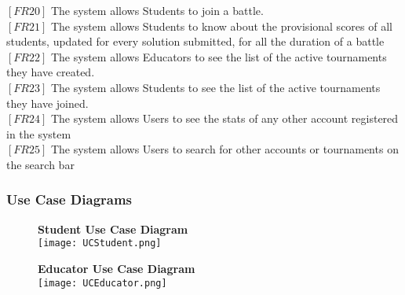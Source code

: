 \documentclass{article}
\begin{document}
$[FR20]$ The system allows Students to join a battle. \\
$[FR21]$ The system allows Students to know about the provisional scores of all students, updated for every solution submitted, for all the duration of a battle\\
$[FR22]$ The system allows Educators to see the list of the active tournaments they have created.\\
$[FR23]$ The system allows Students to see the list of the active tournaments they have joined.\\
$[FR24]$ The system allows Users to see the stats of any other account registered in the system\\
$[FR25]$ The system allows Users to search for other accounts or tournaments on the search bar\\


\subsubsection{Use Case Diagrams}

\begin{figure}[H]
  \centering
  \textbf{Student Use Case Diagram} \\
  \texttt{[image: UCStudent.png]}
\end{figure}

\begin{figure}[H]
  \centering
  \textbf{Educator Use Case Diagram} \\
  \texttt{[image: UCEducator.png]}
\end{figure}

\newpage
\end{document}
